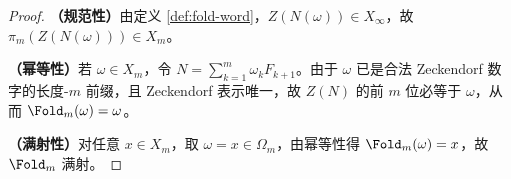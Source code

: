 \begin{proof}
\textbf{（规范性）}由定义 \ref{def:fold-word}，$Z(N(\omega))\in X_\infty$，故 $\pi_m(Z(N(\omega)))\in X_m$。

\textbf{（幂等性）}若 $\omega\in X_m$，令 $N=\sum_{k=1}^m \omega_k F_{k+1}$。由于 $\omega$ 已是合法 Zeckendorf 数字的长度-$m$ 前缀，且 Zeckendorf 表示唯一，故 $Z(N)$ 的前 $m$ 位必等于 $\omega$，从而 $\Fold_m(\omega)=\omega$。

\textbf{（满射性）}对任意 $x\in X_m$，取 $\omega=x\in\Omega_m$，由幂等性得 $\Fold_m(\omega)=x$，故 $\Fold_m$ 满射。
\end{proof}
